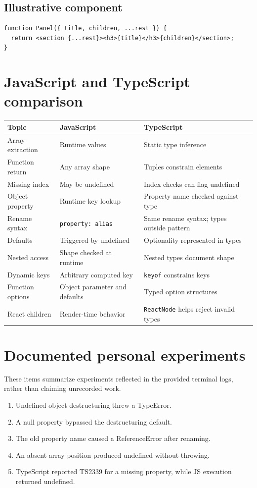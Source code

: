 \documentclass[11pt,a4paper]{article}
\begin{document}
\subsection{Illustrative component}
\begin{lstlisting}
function Panel({ title, children, ...rest }) {
  return <section {...rest}><h3>{title}</h3>{children}</section>;
}
\end{lstlisting}
\section{JavaScript and TypeScript comparison}
\begin{longtable}{@{}p{.27\linewidth}p{.31\linewidth}p{.32\linewidth}@{}}
\toprule Topic & JavaScript & TypeScript \\\midrule\endhead
Array extraction & Runtime values & Static type inference \\
Function return & Any array shape & Tuples constrain elements \\
Missing index & May be undefined & Index checks can flag undefined \\
Object property & Runtime key lookup & Property name checked against type \\
Rename syntax & \texttt{property: alias} & Same rename syntax; types outside pattern \\
Defaults & Triggered by undefined & Optionality represented in types \\
Nested access & Shape checked at runtime & Nested types document shape \\
Dynamic keys & Arbitrary computed key & \texttt{keyof} constrains keys \\
Function options & Object parameter and defaults & Typed option structures \\
React children & Render-time behavior & \texttt{ReactNode} helps reject invalid types \\
\bottomrule
\end{longtable}
\section{Documented personal experiments}
These items summarize experiments reflected in the provided terminal logs, rather than claiming unrecorded work.
\begin{enumerate}[leftmargin=*]
\item Undefined object destructuring threw a TypeError.
\item A null property bypassed the destructuring default.
\item The old property name caused a ReferenceError after renaming.
\item An absent array position produced undefined without throwing.
\item TypeScript reported TS2339 for a missing property, while JS execution returned undefined.
\end{enumerate}
\end{document}

